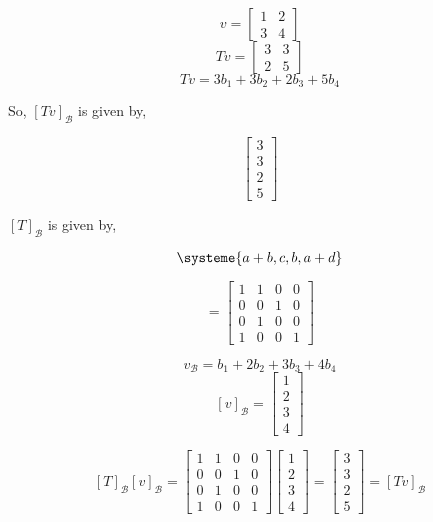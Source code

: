 \documentclass{article}
\begin{document}
\[ v = \begin{bmatrix} 1 & 2 \\ 3 & 4 \end{bmatrix} \]
\[ Tv = \begin{bmatrix} 3 & 3 \\ 2 & 5 \end{bmatrix} \]
\[ Tv = 3b_1 + 3b_2 + 2b_3 + 5b_4 \]

So, $[Tv]_{\mathcal{B}}$ is given by,

\[ \begin{bmatrix} 3 \\ 3 \\ 2 \\ 5 \end{bmatrix} \]

$[T]_{\mathcal{B}}$ is given by, 

\begin{equation*} 
\systeme{
	a + b,
	c,
	b,
	a + d
}
\end{equation*}

\[ = \begin{bmatrix} 1 & 1 & 0 & 0 \\ 0 & 0 & 1 & 0 \\ 0 & 1 & 0 & 0 \\ 1 & 0 & 0 & 1 \end{bmatrix} \]

\[ v_{\mathcal{B}} = b_1 + 2b_2 + 3b_3 + 4b_4 \]
\[ [v]_{\mathcal{B}} = \begin{bmatrix} 1 \\ 2 \\ 3 \\ 4 \end{bmatrix} \]

\[ [T]_{\mathcal{B}}[v]_{\mathcal{B}} = \begin{bmatrix} 1 & 1 & 0 & 0 \\ 0 & 0 & 1 & 0 \\ 0 & 1 & 0 & 0 \\ 1 & 0 & 0 & 1 \end{bmatrix} \begin{bmatrix} 1 \\ 2 \\ 3 \\ 4 \end{bmatrix} = \begin{bmatrix} 3 \\ 3 \\ 2 \\ 5 \end{bmatrix} = [Tv]_{\mathcal{B}} \]
\end{document}
